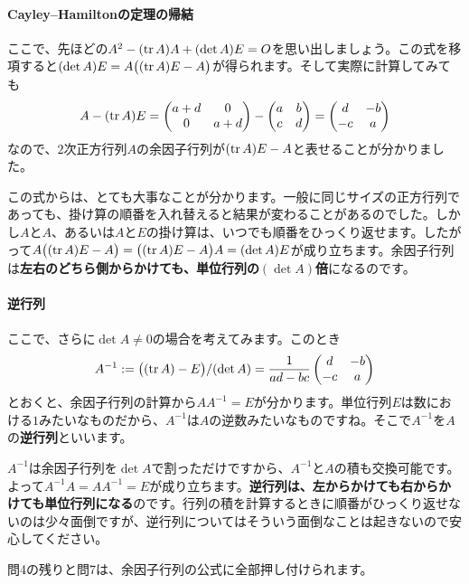 \paragraph{Cayley--Hamiltonの定理の帰結} ここで、先ほどの$A^2 - (\operatorname{tr} A) A + (\det A) E = O$を思い出しましょう。この式を移項すると$(\det A) E = A\bigl((\operatorname{tr} A) E - A\bigr)$が得られます。そして実際に計算してみても
\[
A - (\operatorname{tr} A) E
=
\begin{pmatrix}
a + d & 0 \\
0 & a + d
\end{pmatrix}
-
\begin{pmatrix}
a & b \\
c & d
\end{pmatrix}
=
\begin{pmatrix}
d & -b \\
-c & a
\end{pmatrix}
\]
なので、$2$次正方行列$A$の余因子行列が$(\operatorname{tr} A) E - A$と表せることが分かりました。

この式からは、とても大事なことが分かります。一般に同じサイズの正方行列であっても、掛け算の順番を入れ替えると結果が変わることがあるのでした。しかし$A$と$A$、あるいは$A$と$E$の掛け算は、いつでも順番をひっくり返せます。したがって$A\bigl((\operatorname{tr} A) E - A\bigr) = \bigl((\operatorname{tr} A) E - A\bigr) A = (\det A) E$が成り立ちます。余因子行列は\textbf{左右のどちら側からかけても、単位行列の$(\det A)$倍}になるのです。

\paragraph{逆行列}
ここで、さらに$\det A\neq 0$の場合を考えてみます。このとき
\[
A^{-1} := \bigl((\operatorname{tr} A) - E \bigr)/(\det A)
= \frac{1}{ad-bc}
\begin{pmatrix}
d & -b \\
-c & a
\end{pmatrix}
\]
とおくと、余因子行列の計算から$AA^{-1} = E$が分かります。単位行列$E$は数における$1$みたいなものだから、$A^{-1}$は$A$の逆数みたいなものですね。そこで$A^{-1}$を$A$の\textbf{逆行列}といいます。

$A^{-1}$は余因子行列を$\det A$で割っただけですから、$A^{-1}$と$A$の積も交換可能です。よって$A^{-1}A = A A^{-1} = E$が成り立ちます。\textbf{逆行列は、左からかけても右からかけても単位行列になる}のです。行列の積を計算するときに順番がひっくり返せないのは少々面倒ですが、逆行列についてはそういう面倒なことは起きないので安心してください。

問4の残りと問7は、余因子行列の公式に全部押し付けられます。
